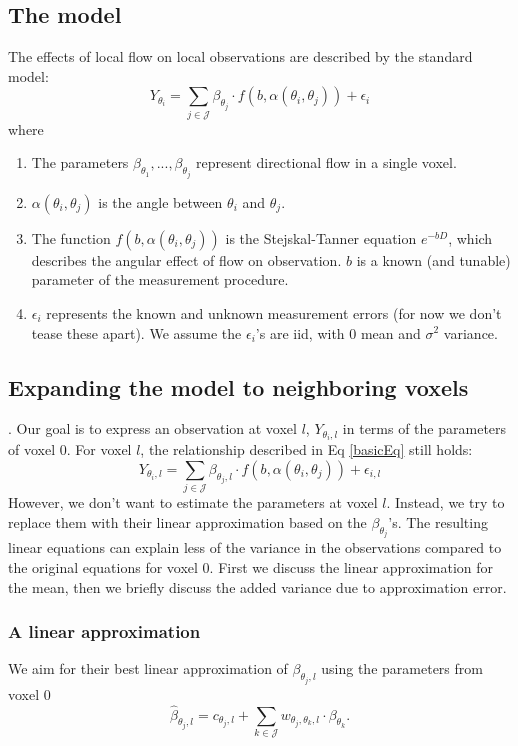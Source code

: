 \documentclass[11pt]{amsart}
\newcommand{\tj}{\theta_j}
\newcommand{\ti}{\theta_i}
\newcommand{\tk}{\theta_k}
\newcommand{\yti}{Y_{\theta_i}}
\newcommand{\ytil}{Y_{\theta_i,l}}
\begin{document}
\subsection{The model}
The effects of local flow on local observations are described by the standard model:
\begin{equation}
\yti = \sum_{j \in \mathcal{J}} \beta_{\tj} \cdot f(b, \alpha(\ti, \tj)) + \epsilon_i 
\label{basicEq}
\end{equation}
where 
\begin{enumerate}
\item The parameters $\beta_{\theta_1},...,\beta_{\tj}$ represent directional flow in a single voxel. 
\item $\alpha(\ti, \tj)$ is the angle between $\ti$ and $\tj$.
\item The function $f(b, \alpha(\ti, \tj))$ is the Stejskal-Tanner equation $e^{-b D}$, which describes the 
angular effect of flow on observation.  
$b$ is a known (and tunable) parameter of the measurement procedure.   
\item $\epsilon_i $ represents the known and unknown measurement errors (for now we don't 
tease these apart). We assume the $\epsilon_i$'s are iid, with $0$ mean and $\sigma^2$ variance.
\end{enumerate}

\subsection{Expanding the model to neighboring voxels}.
Our goal is to express an observation at voxel $l$, $\ytil$ in terms of the parameters 
of voxel 0. For voxel $l$, the relationship described in Eq \eqref{basicEq} still holds:
\begin{equation}
\ytil = \sum_{j \in \mathcal{J}} \beta_{\tj,l} \cdot f(b, \alpha(\ti, \tj)) + \epsilon_{i,l} 
\label{neighbor}
\end{equation}
However, we don't want to estimate the parameters at voxel $l$.
Instead, we try to replace them with their linear approximation based on the $\beta_{\tj}$'s. 
The resulting linear equations can explain less of the variance in the observations compared to the original
equations for voxel 0. First we discuss the linear approximation for the mean, 
then we briefly discuss the added variance due to approximation error. 

\subsubsection{A linear approximation}
We aim for their best linear approximation of $\beta_{\tj,l}$ using the 
parameters from voxel 0
\begin{equation}
\hat{\beta}_{\tj,l} = c_{\tj,l} + \sum_{k\in\mathcal{J}} w_{\tj,\tk, l} \cdot \beta_{\tk}. 
\end{equation} 
\end{document}
